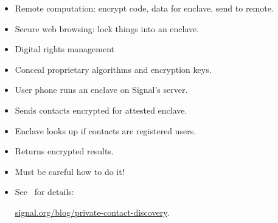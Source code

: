 \begin{frame}
  \begin{example}[Uses]
    \begin{itemize}
      \item Remote computation: encrypt code, data for enclave, send to remote.
      \item Secure web browsing: lock things into an enclave.
      \item Digital rights management
      \item Conceal proprietary algorithms and encryption keys.
    \end{itemize}
  \end{example}
\end{frame}

\begin{frame}
  \begin{example}
    \begin{itemize}
      \item User phone runs an enclave on Signal's server.
      \item Sends contacts encrypted for attested enclave.
      \item Enclave looks up if contacts are registered users.
      \item Returns encrypted results.
    \end{itemize}
  \end{example}

  \pause

  \begin{remark}
    \begin{itemize}
      \item Must be careful how to do it!
      \item See~\cite{SignalSGXContactDiscovery} for details:
        \begin{center}
          \href{https://signal.org/blog/private-contact-discovery/}
            {signal.org/blog/private-contact-discovery}.
        \end{center}
    \end{itemize}
  \end{remark}
\end{frame}

